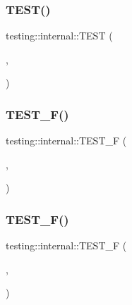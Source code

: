 \mbox{\label{namespacetesting_1_1internal_aaed45d6ba960f02e8d3d042c606bc98e}} 
\subsubsection{\texorpdfstring{TEST()}{TEST()}\hspace{0.1cm}{\footnotesize\ttfamily [43/43]}}
{\footnotesize\ttfamily testing\+::internal\+::\+T\+E\+ST (\begin{DoxyParamCaption}\item[{Thread\+Local\+Test}]{,  }\item[{Pointer\+And\+Const\+Pointer\+Return\+Same\+Value}]{ }\end{DoxyParamCaption})}

\mbox{\label{namespacetesting_1_1internal_a7e113e9c70d45d89fe1703e58ff083b9}} 
\subsubsection{\texorpdfstring{TEST\_F()}{TEST\_F()}\hspace{0.1cm}{\footnotesize\ttfamily [1/2]}}
{\footnotesize\ttfamily testing\+::internal\+::\+T\+E\+S\+T\+\_\+F (\begin{DoxyParamCaption}\item[{\mbox{\hyperlink{classtesting_1_1internal_1_1_listener_test}{Listener\+Test}}}]{,  }\item[{Does\+Foo}]{ }\end{DoxyParamCaption})}

\mbox{\label{namespacetesting_1_1internal_a02cef32090020d164460dd3d9f8e2852}} 
\subsubsection{\texorpdfstring{TEST\_F()}{TEST\_F()}\hspace{0.1cm}{\footnotesize\ttfamily [2/2]}}
{\footnotesize\ttfamily testing\+::internal\+::\+T\+E\+S\+T\+\_\+F (\begin{DoxyParamCaption}\item[{\mbox{\hyperlink{classtesting_1_1internal_1_1_listener_test}{Listener\+Test}}}]{,  }\item[{Does\+Bar}]{ }\end{DoxyParamCaption})}

